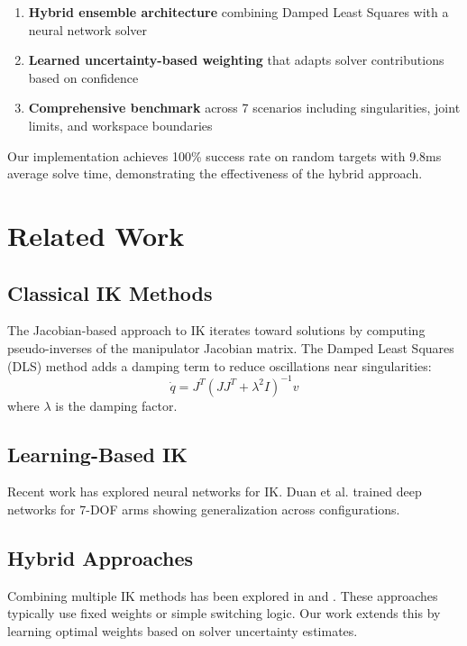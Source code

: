 \documentclass[12pt]{article}
\begin{document}
\begin{enumerate}
    \item \textbf{Hybrid ensemble architecture} combining Damped Least Squares with a neural network solver
    \item \textbf{Learned uncertainty-based weighting} that adapts solver contributions based on confidence
    \item \textbf{Comprehensive benchmark} across 7 scenarios including singularities, joint limits, and workspace boundaries
\end{enumerate}

Our implementation achieves 100\% success rate on random targets with 9.8ms average solve time, demonstrating the effectiveness of the hybrid approach.

\section{Related Work}

\subsection{Classical IK Methods}
The Jacobian-based approach to IK iterates toward solutions by computing pseudo-inverses of the manipulator Jacobian matrix. The Damped Least Squares (DLS) method \cite{nakamura1986inverse} adds a damping term to reduce oscillations near singularities:
\begin{equation}
\dot{q} = J^T (JJ^T + \lambda^2 I)^{-1} v
\end{equation}
where $\lambda$ is the damping factor.

\subsection{Learning-Based IK}
Recent work has explored neural networks for IK. Duan et al. \cite{duan2018one} trained deep networks for 7-DOF arms showing generalization across configurations.

\subsection{Hybrid Approaches}
Combining multiple IK methods has been explored in \cite{keemink2012adapting} and \cite{asenov2017ensemble}. These approaches typically use fixed weights or simple switching logic. Our work extends this by learning optimal weights based on solver uncertainty estimates.
\end{document}
